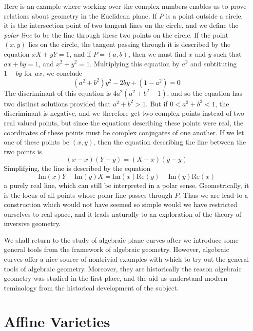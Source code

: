 \begin{example}
    Here is an example where working over the complex numbers enables us to prove relations about geometry in the Euclidean plane. If $P$ is a point outside a circle, it is the intersection point of two tangent lines on the circle, and we define the {\it polar line} to be the line through these two points on the circle. If the point $(x,y)$ lies on the circle, the tangent passing through it is described by the equation $xX + yY = 1$, and if $P = (a,b)$, then we must find $x$ and $y$ such that $ax + by = 1$, and $x^2 + y^2 = 1$. Multiplying this equation by $a^2$ and subtituting $1 - by$ for $ax$, we conclude
    \[ (a^2 + b^2)y^2 - 2by + (1 - a^2) = 0 \]
    The discriminant of this equation is $4a^2(a^2 + b^2 - 1)$, and so the equation has two distinct solutions provided that $a^2 + b^2 > 1$. But if $0 < a^2 + b^2 < 1$, the discriminant is negative, and we therefore get two complex points instead of two real valued points, but since the equations describing these points were real, the coordinates of these points must be complex conjugates of one another. If we let one of these points be $(x,y)$, then the equation describing the line between the two points is
    \[ (\overline{x} - x)(Y - y) = (X - x)(\overline{y} - y) \]
    Simplifying, the line is described by the equation
    \[ \text{Im}(x) Y - \text{Im}(y) X = \text{Im}(x) \text{Re}(y) - \text{Im}(y) \text{Re}(x) \]
    a purely real line, which can still be interpreted in a polar sense. Geometrically, it is the locus of all points whose polar line passes through $P$. Thus we are lead to a construction which would not have seemed so simple would we have restricted ourselves to real space, and it leads naturally to an exploration of the theory of inversive geometry.
\end{example}

We shall return to the study of algebraic plane curves after we introduce some general tools from the framework of algebraic geometry. However, algebraic curves offer a nice source of nontrivial examples with which to try out the general tools of algebraic geometry. Moreover, they are historically the reason algebraic geometry was studied in the first place, and the aid us understand modern teminology from the historical development of the subject.

\section{Affine Varieties}

